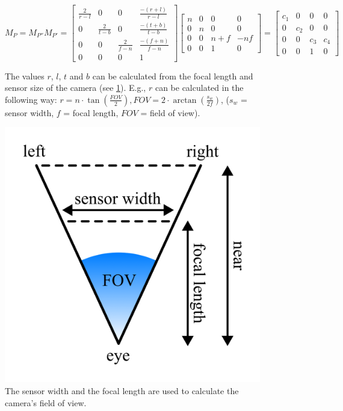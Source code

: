 \documentclass[conference]{IEEEtran}
\begin{document}
\begin{figure}[h]
    \begin{equation} \label{eqn:API_matrix}
        M_{P} = M_{P''} M_{P'} =
        \begin{bmatrix}
            \frac{2}{r - l} & 0               & 0               & \frac{-(r + l)}{r - l} \\
            0               & \frac{2}{t - b} & 0               & \frac{-(t + b)}{t - b} \\
            0               & 0               & \frac{2}{f - n} & \frac{-(f + n)}{f - n} \\
            0               & 0               & 0               & 1
        \end{bmatrix}
        \begin{bmatrix}
            n & 0 & 0     & 0   \\
            0 & n & 0     & 0   \\
            0 & 0 & n + f & -nf \\
            0 & 0 & 1     & 0
        \end{bmatrix}
        =
        \begin{bmatrix}
            c_1 & 0   & 0   & 0   \\
            0   & c_2 & 0   & 0   \\
            0   & 0   & c_3 & c_4 \\
            0   & 0   & 1   & 0
        \end{bmatrix}
    \end{equation}
    \caption[]{The values $r$, $l$, $t$ and $b$ can be calculated from the focal length and sensor size of the camera (see \ref{img:fov}). E.g., $r$ can be calculated in the following way:
        $r = n \cdot \tan\left(\frac{FOV}{2}\right),
            FOV = 2 \cdot \arctan\left(\frac{s_w}{2f}\right)$,
        ($s_w$ = sensor width, $f$ = focal length, $FOV$ = field of view).
    }
\end{figure}

\begin{figure}[H]
    \centering
    \includegraphics[width=0.4\columnwidth]{./images/focal_lenght_and_field_of_view.png}
    \caption{The sensor width and the focal length are used to calculate the camera's field of view.}
    \label{img:fov}
\end{figure}
\end{document}

